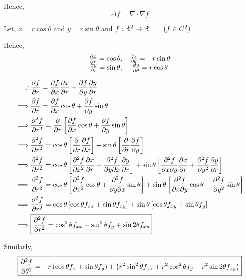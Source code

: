 \documentclass[../Analysis-3]{subfiles}
\begin{document}
Hence, \[\boxed{\Delta f = \nabla\cdot\nabla f}\]

Let, $x = r\cos{\theta}$ and $y= r\sin{\theta}$ and $f : \mathbb{R}^2 \to \mathbb{R} \qquad ( f \in C^2) $

Hence,
\[\begin{matrix}
        \pdv{x}{r} = \cos{\theta}, & \pdv{x}{\theta} = -r\sin{\theta} \\
        \pdv{y}{r} = \sin{\theta}, & \pdv{y}{\theta} = r\cos{\theta}
    \end{matrix}\]

\begin{align*}
    \therefore & \pdv{f}{r} = \pdv{f}{x} \pdv{x}{r} + \pdv{f}{y}\pdv{y}{r}                                                                                                                               \\
    \implies   & \pdv{f}{r} = \pdv{f}{x} \cos{\theta} + \pdv{f}{y}\sin{\theta}                                                                                                                           \\
    \implies   & \pdv[2]{f}{r} = \pdv{}{r} \left[\pdv{f}{x} \cos{\theta} + \pdv{f}{y} \sin{\theta} \right]                                                                                               \\
    \implies   & \pdv[2]{f}{r} = \cos{\theta} \left[\pdv{}{r} \pdv{f}{x}\right] + \sin{\theta} \left[\pdv{}{r} \pdv{f}{y} \right]                                                                        \\
    \implies   & \pdv[2]{f}{r} = \cos{\theta} \left[\pdv[2]{f}{x} \pdv{x}{r} + \pdv{f}{y}{x} \pdv{y}{r} \right] + \sin{\theta} \left[\pdv{f}{x}{y} \pdv{x}{r} + \pdv[2]{f}{y} \pdv{y}{r} \right]         \\
    \implies   & \pdv[2]{f}{r} = \cos{\theta} \left[\pdv[2]{f}{x} \cos{\theta} + \pdv{f}{y}{x} \sin{\theta} \right] + \sin{\theta} \left[\pdv{f}{x}{y} \cos{\theta} + \pdv[2]{f}{y} \sin{\theta} \right] \\
    \implies   & \pdv[2]{f}{r} = \cos{\theta} \left[\cos{\theta} f_{xx} + \sin{\theta} f_{xy} \right] + \sin{\theta} \left[\cos{\theta} f_{xy} + \sin{\theta} f_{y} \right]                              \\
    \implies   & \boxed{\pdv[2]{f}{r} = \cos^2 \theta f_{xx} + \sin^2 \theta f_{y} + \sin 2 \theta f_{xy}}
\end{align*}


Similarly, \[ \boxed{\pdv[2]{f}{\theta} = -r \left( \cos{\theta} f_x + \sin{\theta} f_y \right) + \left( r^2\sin^2 \theta f_{xx} + r^2\cos^2 \theta f_{y} - r^2\sin 2 \theta f_{xy} \right)} \]
\end{document}
